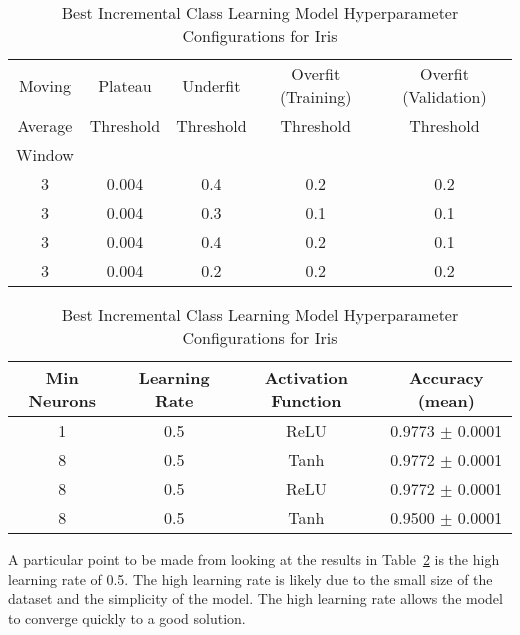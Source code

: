 \documentclass[conference]{IEEEtran}
\begin{document}
\begin{table}[H]
  \centering
  \caption{Best Incremental Class Learning Model Hyperparameter Configurations for Iris}
  \label{tab:icl_iris_best_configs}
  \scriptsize
  \setlength{\tabcolsep}{6pt}

  \begin{minipage}{\linewidth}
    \centering
    \begin{tabular}{@{}ccccc@{}}
      \toprule
 Moving & Plateau & Underfit & Overfit (Training) & Overfit (Validation) \\
 Average & Threshold & Threshold & Threshold & Threshold \\
 Window & & & & \\
      \midrule
 3 & 0.004 & 0.4 & 0.2 & 0.2 \\
 3 & 0.004 & 0.3 & 0.1 & 0.1 \\
 3 & 0.004 & 0.4 & 0.2 & 0.1 \\
 3 & 0.004 & 0.2 & 0.2 & 0.2 \\
      \bottomrule
    \end{tabular}
  \end{minipage}

  \vspace{6pt}

  \begin{minipage}{\linewidth}
    \centering
    \begin{tabular}{@{}cccc@{}}
      \toprule
 Min Neurons & Learning Rate & Activation Function & Accuracy (mean) \\
      \midrule
 1 & 0.5 & ReLU & 0.9773 $\pm$ 0.0001\\
 8 & 0.5 & Tanh & 0.9772 $\pm$ 0.0001\\
 8 & 0.5 & ReLU & 0.9772 $\pm$ 0.0001\\
 8 & 0.5 & Tanh & 0.9500 $\pm$ 0.0001\\
      \bottomrule
    \end{tabular}
  \end{minipage}
\end{table}
A particular point to be made from looking at the results in Table~\ref{tab:icl_iris_best_configs} is the high learning rate of 0.5. 
The high learning rate is likely due to the small size of the dataset and the simplicity of the model. The high learning rate allows the model to converge quickly to a good solution.
\end{document}
